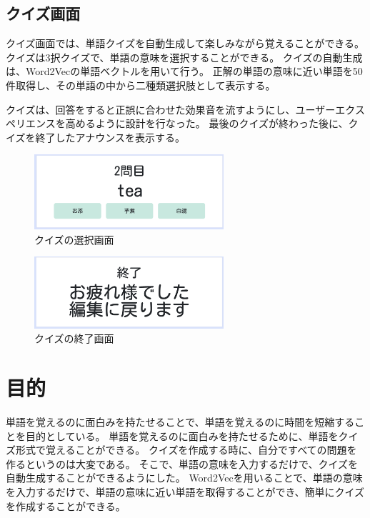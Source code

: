 \documentclass[11pt,a4paper]{jsarticle}
\begin{document}
\subsection{クイズ画面}
クイズ画面では、単語クイズを自動生成して楽しみながら覚えることができる。
クイズは3択クイズで、単語の意味を選択することができる。
クイズの自動生成は、Word2Vecの単語ベクトルを用いて行う。
正解の単語の意味に近い単語を50件取得し、その単語の中から二種類選択肢として表示する。

クイズは、回答をすると正誤に合わせた効果音を流すようにし、ユーザーエクスペリエンスを高めるように設計を行なった。
最後のクイズが終わった後に、クイズを終了したアナウンスを表示する。


\begin{figure}[htbp]
    \begin{center}
        \includegraphics[width=70mm]{./img/question.png}
    \end{center}
    \caption{クイズの選択画面}
\end{figure}


\begin{figure}[htbp]
    \begin{center}
        \includegraphics[width=70mm]{./img/question_end.png}
    \end{center}
    \caption{クイズの終了画面}
\end{figure}



\section{目的}

単語を覚えるのに面白みを持たせることで、単語を覚えるのに時間を短縮することを目的としている。
単語を覚えるのに面白みを持たせるために、単語をクイズ形式で覚えることができる。
クイズを作成する時に、自分ですべての問題を作るというのは大変である。
そこで、単語の意味を入力するだけで、クイズを自動生成することができるようにした。
Word2Vecを用いることで、単語の意味を入力するだけで、単語の意味に近い単語を取得することができ、簡単にクイズを作成することができる。
\end{document}

